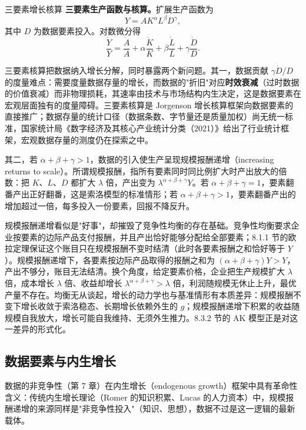 \begin{derivation}{三要素增长核算}{}
\textbf{三要素生产函数与核算。}扩展生产函数为
\[
Y = A K^\alpha L^\beta D^\gamma,
\]
其中 $D$ 为数据要素投入。对数微分得
\[
\frac{\dot Y}{Y} = \frac{\dot A}{A} + \alpha\frac{\dot K}{K} + \beta\frac{\dot L}{L} + \gamma\frac{\dot D}{D}.
\]
\end{derivation}

三要素核算把数据纳入增长分解，同时暴露两个新问题。其一，数据贡献 $\gamma \dot D/D$ 的度量难点：需要度量数据存量的增长，而数据的"折旧"对应\textbf{时效衰减}（过时数据的价值衰减）而非物理损耗，其速率由技术与市场结构内生决定，这是数据要素在宏观层面独有的度量障碍。三要素核算是 Jorgenson 增长核算框架向数据要素的直接推广；数据存量的统计口径（数据条数、字节量还是质量加权）尚无统一标准，国家统计局《数字经济及其核心产业统计分类（2021）》给出了行业统计框架，宏观数据存量的测度仍在探索之中。

其二，若 $\alpha+\beta+\gamma>1$，数据的引入使生产呈现规模报酬递增（increasing returns to scale）。所谓规模报酬，指所有要素同时同比例扩大时产出放大的倍数：把 $K$、$L$、$D$ 都扩大 $\lambda$ 倍，产出变为 $\lambda^{\alpha+\beta+\gamma}Y$。若 $\alpha+\beta+\gamma=1$，要素翻番产出正好翻番，这是索洛模型的标准情形；若 $\alpha+\beta+\gamma>1$，要素翻番产出的增加超过一倍，每多投入一份要素，回报不降反升。

规模报酬递增看似是"好事"，却摧毁了竞争性均衡的存在基础。竞争性均衡要求企业按要素的边际产品支付报酬，并且产出恰好能够分配给全部要素；8.1.1 节的欧拉定理保证这个账目只在规模报酬不变时结清（此时各要素报酬之和恰好等于 $Y$）。规模报酬递增下，各要素按边际产品取得的报酬之和为 $(\alpha+\beta+\gamma)Y>Y$，产出不够分，账目无法结清。换个角度，给定要素价格，企业把生产规模扩大 $\lambda$ 倍，成本增长 $\lambda$ 倍、收益却增长 $\lambda^{\alpha+\beta+\gamma}>\lambda$ 倍，利润随规模无休止上升，最优产量不存在。均衡无从谈起，增长的动力学也与基准情形有本质差异：规模报酬不变下增长收敛于索洛稳态、长期增长依赖外生的 $g$；规模报酬递增下积累的收益随规模自我放大，增长可能自我维持、无须外生推力。8.3.2 节的 AK 模型正是对这一差异的形式化。

\subsection{数据要素与内生增长}

数据的非竞争性（第 7 章）在内生增长（endogenous growth）框架中具有革命性含义：传统内生增长理论（Romer 的知识积累、Lucas 的人力资本）中，规模报酬递增的来源同样是"非竞争性投入"（知识、思想），数据不过是这一逻辑的最新载体。

